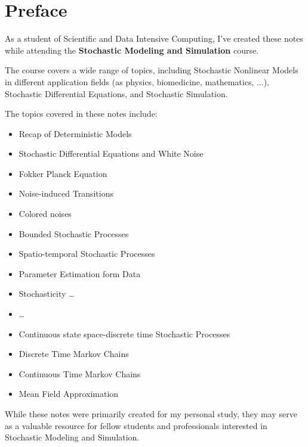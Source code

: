 \chapter*{Preface}

As a student of Scientific and Data Intensive Computing, I've created these notes while attending the \textbf{Stochastic Modeling and Simulation} course.

The course covers a wide range of topics, including Stochastic Nonlinear Models in different application fields (as physics, biomedicine, mathematics, ...), Stochastic Differential Equations, and Stochastic Simulation.

\vspace{1em}

The topics covered in these notes include:

\begin{itemize}
\item Recap of Deterministic Models
\item Stochastic Differential Equations and White Noise
\item Fokker Planck Equation
\item Noise-induced Transitions
\item Colored noises
\item Bounded Stochastic Processes
\item Spatio-temporal Stochastic Processes
\item Parameter Estimation form Data
\item Stochasticity \dots
\item \dots
\item Continuous state space-discrete time Stochastic Processes
\item Discrete Time Markov Chains
\item Continuous Time Markov Chains
\item Mean Field Approximation
\end{itemize}

\vspace{1em}

While these notes were primarily created for my personal study, they may serve as a valuable resource for fellow students and professionals interested in Stochastic Modeling and Simulation.